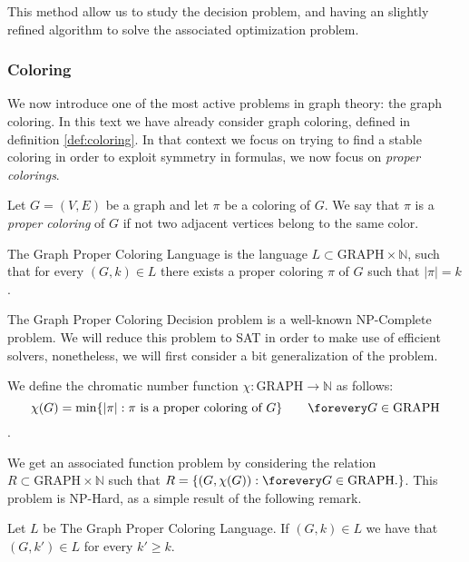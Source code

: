 This method allow us to study the decision problem, and having an slightly refined algorithm to solve the associated optimization problem. 

\subsubsection{Coloring}

We now introduce one of the most active problems in graph theory: the graph coloring. In this text we have already consider graph coloring, defined in definition \ref{def:coloring}. In that context we focus on  trying to find a stable coloring in order to exploit symmetry in formulas, we now focus on \emph{proper colorings}.



\begin{definition}
  Let $G=(V,E)$ be a graph and let $\pi$ be a coloring of $G$. We say that $\pi$ is a \emph{proper coloring} of $G$ if not two adjacent vertices belong to the same color.  
\end{definition}

\begin{definition}
  The Graph Proper Coloring Language is the language $L\subset \text{GRAPH}\times \mathbb{N}$, such that for every $(G,k)\in L$ there exists a proper coloring $\pi$ of $G$ such that $|\pi| = k$.  
\end{definition}

The  Graph Proper Coloring Decision problem is a well-known NP-Complete problem. We will reduce this problem to SAT in order to make use of efficient solvers, nonetheless, we will first consider a bit generalization of the problem.

\begin{definition}
  We define the chromatic number function $\chi:\text{GRAPH}\to \mathbb{N}$ as follows:
  $$ \chi(G) = \min\{|\pi|: \pi \text{ is a proper coloring of } G\} \qquad \forevery G \in \text{GRAPH}$$. 
\end{definition}

We get an associated function problem by considering the relation $R \subset \text{GRAPH}\times \mathbb{N}$ such that $R = \{(G,\chi(G)): \forevery G \in \text{GRAPH}.\}$. This problem is NP-Hard, as a simple result of the following remark.

\begin{remark}
  Let $L$ be  The Graph Proper Coloring Language. If $(G,k) \in L$ we have that $(G,k')\in L$ for every $k'\ge k$.
\end{remark}

